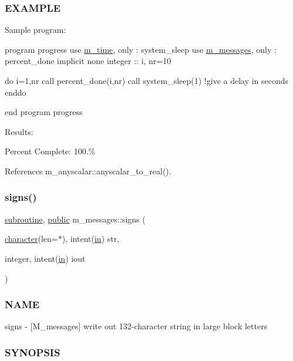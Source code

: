 \subsubsection*{E\+X\+A\+M\+P\+LE}

Sample program\+:

program progress use \hyperlink{namespacem__time}{m\+\_\+time}, only \+: system\+\_\+sleep use \hyperlink{namespacem__messages}{m\+\_\+messages}, only \+: percent\+\_\+done implicit none integer \+:\+: i, nr=10

do i=1,nr call percent\+\_\+done(i,nr) call system\+\_\+sleep(1) !give a delay in seconds enddo

end program progress

Results\+:

Percent Complete\+: 100.\% 

References m\+\_\+anyscalar\+::anyscalar\+\_\+to\+\_\+real().

\mbox{\label{namespacem__messages_a239cb1269cc27d45176b9a278276d399}} 
\subsubsection{\texorpdfstring{signs()}{signs()}}
{\footnotesize\ttfamily \hyperlink{M__stopwatch_83_8txt_acfbcff50169d691ff02d4a123ed70482}{subroutine}, \hyperlink{M__stopwatch_83_8txt_a2f74811300c361e53b430611a7d1769f}{public} m\+\_\+messages\+::signs (\begin{DoxyParamCaption}\item[{\hyperlink{option__stopwatch_83_8txt_abd4b21fbbd175834027b5224bfe97e66}{character}(len=$\ast$), intent(\hyperlink{M__journal_83_8txt_afce72651d1eed785a2132bee863b2f38}{in})}]{str,  }\item[{integer, intent(\hyperlink{M__journal_83_8txt_afce72651d1eed785a2132bee863b2f38}{in})}]{iout }\end{DoxyParamCaption})}



\subsubsection*{N\+A\+ME}

signs -\/ \mbox{[}M\+\_\+messages\mbox{]} write out 132-\/character string in large block letters 

\subsubsection*{S\+Y\+N\+O\+P\+S\+IS}

